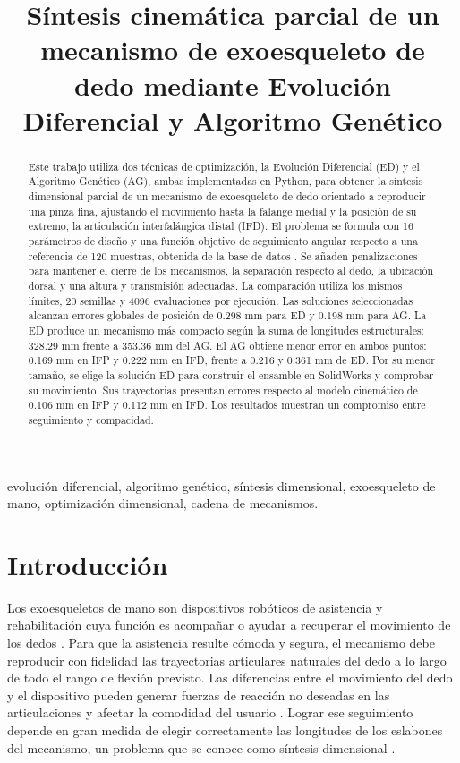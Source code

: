 \documentclass[conference,letterpaper]{IEEEtran}
\title{Síntesis cinemática parcial de un mecanismo de exoesqueleto de dedo mediante Evolución Diferencial y Algoritmo Genético}
\author{}
\begin{document}
\maketitle
\begin{abstract}
Este trabajo utiliza dos técnicas de optimización, la Evolución Diferencial (ED) y el Algoritmo Genético (AG), ambas implementadas en Python, para obtener la síntesis dimensional parcial de un mecanismo de exoesqueleto de dedo orientado a reproducir una pinza fina, ajustando el movimiento hasta la falange medial y la posición de su extremo, la articulación interfalángica distal (IFD). El problema se formula con 16 parámetros de diseño y una función objetivo de seguimiento angular respecto a una referencia de 120 muestras, obtenida de la base de datos \cite{r1}. Se añaden penalizaciones para mantener el cierre de los mecanismos, la separación respecto al dedo, la ubicación dorsal y una altura y transmisión adecuadas. La comparación utiliza los mismos límites, 20 semillas y 4096 evaluaciones por ejecución. Las soluciones seleccionadas alcanzan errores globales de posición de 0.298 mm para ED y 0.198 mm para AG. La ED produce un mecanismo más compacto según la suma de longitudes estructurales: 328.29 mm frente a 353.36 mm del AG. El AG obtiene menor error en ambos puntos: 0.169 mm en IFP y 0.222 mm en IFD, frente a 0.216 y 0.361 mm de ED. Por su menor tamaño, se elige la solución ED para construir el ensamble en SolidWorks y comprobar su movimiento. Sus trayectorias presentan errores respecto al modelo cinemático de 0.106 mm en IFP y 0.112 mm en IFD. Los resultados muestran un compromiso entre seguimiento y compacidad.
\end{abstract}
\begin{IEEEkeywords}
evolución diferencial, algoritmo genético, síntesis dimensional, exoesqueleto de mano, optimización dimensional, cadena de mecanismos.
\end{IEEEkeywords}

\section{Introducción}
Los exoesqueletos de mano son dispositivos robóticos de asistencia y rehabilitación cuya función es acompañar o ayudar a recuperar el movimiento de los dedos \cite{r2}. Para que la asistencia resulte cómoda y segura, el mecanismo debe reproducir con fidelidad las trayectorias articulares naturales del dedo a lo largo de todo el rango de flexión previsto. Las diferencias entre el movimiento del dedo y el dispositivo pueden generar fuerzas de reacción no deseadas en las articulaciones y afectar la comodidad del usuario \cite{r3}. Lograr ese seguimiento depende en gran medida de elegir correctamente las longitudes de los eslabones del mecanismo, un problema que se conoce como síntesis dimensional \cite{r4}.
\end{document}
